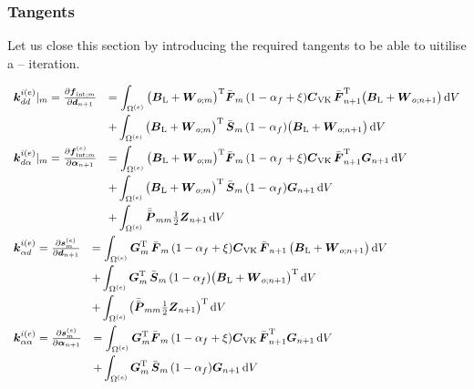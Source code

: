 \subsubsection{Tangents}
Let us close this section by introducing the required tangents to be able to
uitilise a -- iteration.

\begin{align}
&
\begin{array}{rl}
  \boldsymbol{k}_{dd}^{i(e)}|_m
  = \frac{\partial \boldsymbol{f}_{\text{int};m}}{\partial \boldsymbol{d}_{n+1}}
& = \displaystyle\int_{\Omega^{(e)}}
    \big( \boldsymbol{B}_{\text{L}} + \boldsymbol{W}_{o;m} \big)^{\mathrm{T}} 
    \bar{\boldsymbol{F}}_m \, (1-\alpha_f+\xi) \boldsymbol{C}_{\text{VK}} \, \bar{\boldsymbol{F}}_{n+1}^{\mathrm{T}}
    \big( \boldsymbol{B}_{\text{L}} + \boldsymbol{W}_{o;n+1} \big)
    \, \mathrm{d} V
\\[2ex]
& + \displaystyle\int_{\Omega^{(e)}}
    \big( \boldsymbol{B}_{\text{L}} + \boldsymbol{W}_{o;m} \big)^{\mathrm{T}}
    \, \bar{\boldsymbol{S}}_m \,
    (1-\alpha_f)\big( \boldsymbol{B}_{\text{L}} + \boldsymbol{W}_{o;n+1} \big)
    \, \mathrm{d} V
\end{array}
\\
&
\begin{array}{rl}
  \boldsymbol{k}_{d\alpha}^{i(e)}|_m
  = \frac{\partial \boldsymbol{f}_{\text{int};m}^{(e)}}{\partial \boldsymbol{\alpha}_{n+1}}
& = \displaystyle\int_{\Omega^{(e)}}
    \big( \boldsymbol{B}_{\text{L}} + \boldsymbol{W}_{o;m} \big)^{\mathrm{T}} 
    \bar{\boldsymbol{F}}_m \, (1-\alpha_f+\xi)\boldsymbol{C}_{\text{VK}} \, \bar{\boldsymbol{F}}_{n+1}^{\mathrm{T}}
    \boldsymbol{G}_{n+1}
    \, \mathrm{d} V
\\[2ex]
& + \displaystyle\int_{\Omega^{(e)}}
    \big( \boldsymbol{B}_{\text{L}} + \boldsymbol{W}_{o;m} \big)^{\mathrm{T}}
    \, \bar{\boldsymbol{S}}_m \,
    (1-\alpha_f)\boldsymbol{G}_{n+1}
    \, \mathrm{d} V
\\[2ex]
& + \displaystyle\int_{\Omega^{(e)}}
    \bar{\bar{\boldsymbol{P}}}_{mm} \tfrac{1}{2}\boldsymbol{Z}_{n+1}
    \, \mathrm{d} V
\end{array}
\\
&
\begin{array}{rl}
  \boldsymbol{k}_{\alpha d}^{i(e)}
  = \frac{\partial \boldsymbol{s}_{m}^{(e)}}{\partial \boldsymbol{d}_{n+1}}
& = \displaystyle\int_{\Omega^{(e)}}
    \boldsymbol{G}_{m}^{\mathrm{T}} \, \bar{\boldsymbol{F}}_{m}
    \, (1-\alpha_f+\xi)\boldsymbol{C}_{\text{VK}} 
    \, \bar{\boldsymbol{F}}_{n+1} \,\big( \boldsymbol{B}_{\text{L}} + \boldsymbol{W}_{o;n+1} \big)
    \, \mathrm{d} V
\\[2ex]
& + \displaystyle\int_{\Omega^{(e)}}
    \boldsymbol{G}_m^{\mathrm{T}}
    \, \bar{\boldsymbol{S}}_m
    \, (1-\alpha_f) \big( \boldsymbol{B}_{\text{L}} + \boldsymbol{W}_{o;n+1} \big)^{\mathrm{T}}
    \, \mathrm{d} V
\\[2ex]
& + \displaystyle\int_{\Omega^{(e)}}
    \big( \bar{\bar{\boldsymbol{P}}}_{mm} \tfrac{1}{2}\boldsymbol{Z}_{n+1} \big)^{\mathrm{T}}
    \, \mathrm{d} V
\end{array}
\\
&
\begin{array}{rl}
  \boldsymbol{k}_{\alpha\alpha}^{i(e)}
  = \frac{\partial \boldsymbol{s}_{m}^{(e)}}{\partial \boldsymbol{\alpha}_{n+1}}
& = \displaystyle\int_{\Omega^{(e)}}
    \boldsymbol{G}_m^{\mathrm{T}}
    \bar{\boldsymbol{F}}_m \, (1-\alpha_f+\xi)\boldsymbol{C}_{\text{VK}} \, \bar{\boldsymbol{F}}_{n+1}^{\mathrm{T}}
    \boldsymbol{G}_{n+1}
    \, \mathrm{d} V
\\[2ex]
& + \displaystyle\int_{\Omega^{(e)}}
    \boldsymbol{G}_m^{\mathrm{T}}
    \, \bar{\boldsymbol{S}}_m \,
    (1-\alpha_f)\boldsymbol{G}_{n+1}
    \, \mathrm{d} V
\end{array}
\end{align}

